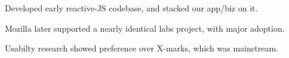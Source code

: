 \documentclass[letterpaper]{deedy-resume} %
\begin{document}
\begin{minipage}[t]{0.66\textwidth}
\sectionspace %



\begin{tightitemize}
\item Developed early reactive-JS codebase, and stacked our app/biz on it.
\item Mozilla later supported a nearly identical labs project, with major adoption.
\item Usabilty research showed preference over X-marks, which was mainstream.
\end{tightitemize}

\sectionspace %

\end{minipage} %


\newpage %


\end{document}
